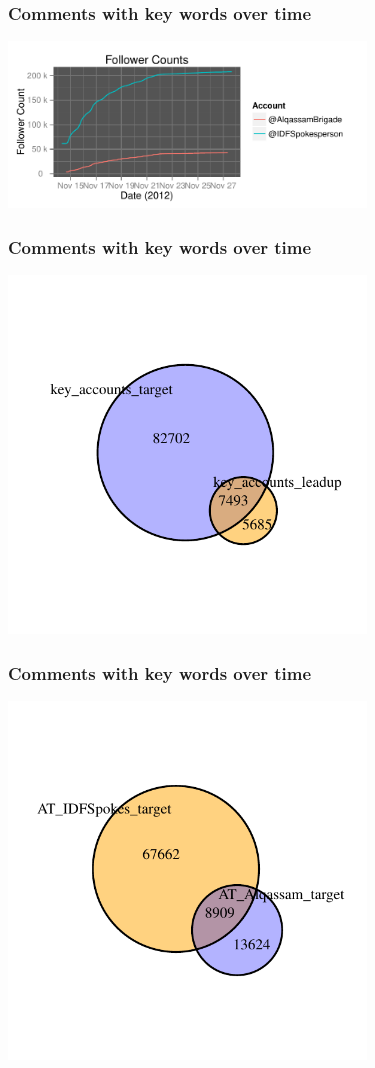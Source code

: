 \documentclass{beamer}
\begin{document}
\begin{frame}\frametitle{Comments with key words over time}
  \begin{center}
    \includegraphics[width=9.5cm]{./imgs/HI_minimal-followers.pdf}
  \end{center}
\end{frame}


\begin{frame}\frametitle{Comments with key words over time}
  \begin{center}
    \includegraphics[width=9.5cm]{./imgs/HI_minimal-venns6.pdf}
  \end{center}
\end{frame}

\begin{frame}\frametitle{Comments with key words over time}
  \begin{center}
    \includegraphics[width=9.5cm]{./imgs/HI_minimal-venns8.pdf}
  \end{center}
\end{frame}
\end{document}
